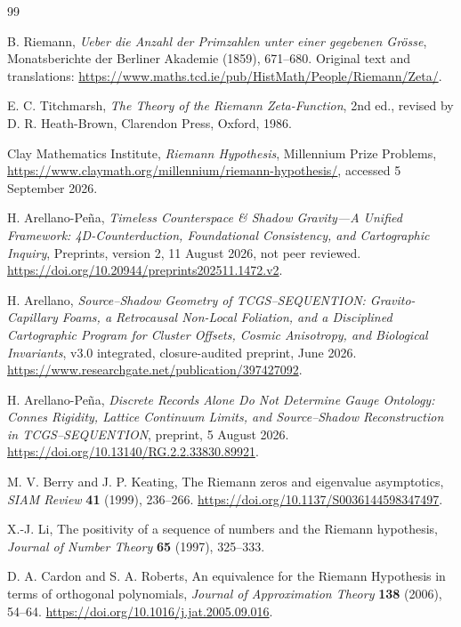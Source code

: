 \documentclass[11pt,letterpaper]{article}
\numberwithin{equation}{section}
\theoremstyle{definition}
\theoremstyle{remark}
\begin{document}
\begin{thebibliography}{99}

B. Riemann,
\emph{Ueber die Anzahl der Primzahlen unter einer gegebenen Gr\"osse},
Monatsberichte der Berliner Akademie (1859), 671--680.
Original text and translations: \url{https://www.maths.tcd.ie/pub/HistMath/People/Riemann/Zeta/}.

E. C. Titchmarsh,
\emph{The Theory of the Riemann Zeta-Function},
2nd ed., revised by D. R. Heath-Brown,
Clarendon Press, Oxford, 1986.

Clay Mathematics Institute,
\emph{Riemann Hypothesis}, Millennium Prize Problems,
\url{https://www.claymath.org/millennium/riemann-hypothesis/},
accessed 5 September 2026.

H. Arellano-Pe\~na,
\emph{Timeless Counterspace \& Shadow Gravity---A Unified Framework:
4D-Counterduction, Foundational Consistency, and Cartographic Inquiry},
Preprints, version 2, 11 August 2026, not peer reviewed.
\url{https://doi.org/10.20944/preprints202511.1472.v2}.

H. Arellano,
\emph{Source--Shadow Geometry of TCGS--SEQUENTION:
Gravito-Capillary Foams, a Retrocausal Non-Local Foliation,
and a Disciplined Cartographic Program for Cluster Offsets,
Cosmic Anisotropy, and Biological Invariants},
v3.0 integrated, closure-audited preprint, June 2026.
\url{https://www.researchgate.net/publication/397427092}.

H. Arellano-Pe\~na,
\emph{Discrete Records Alone Do Not Determine Gauge Ontology:
Connes Rigidity, Lattice Continuum Limits, and Source--Shadow
Reconstruction in TCGS--SEQUENTION},
preprint, 5 August 2026.
\url{https://doi.org/10.13140/RG.2.2.33830.89921}.

M. V. Berry and J. P. Keating,
The Riemann zeros and eigenvalue asymptotics,
\emph{SIAM Review} \textbf{41} (1999), 236--266.
\url{https://doi.org/10.1137/S0036144598347497}.

X.-J. Li,
The positivity of a sequence of numbers and the Riemann hypothesis,
\emph{Journal of Number Theory} \textbf{65} (1997), 325--333.

D. A. Cardon and S. A. Roberts,
An equivalence for the Riemann Hypothesis in terms of orthogonal polynomials,
\emph{Journal of Approximation Theory} \textbf{138} (2006), 54--64.
\url{https://doi.org/10.1016/j.jat.2005.09.016}.


\end{thebibliography}
\end{document}
